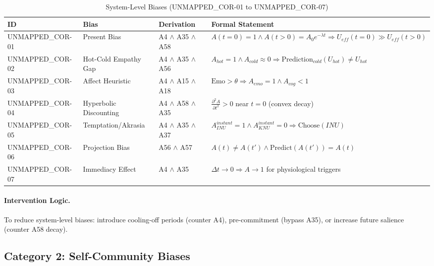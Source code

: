 \begin{table}[htbp]
\small
\centering
\caption{System-Level Biases (UNMAPPED_COR-01 to UNMAPPED_COR-07)}
\label{tab:cor-system}
\begin{tabular}{p{1.2cm}p{2.5cm}p{4cm}p{5cm}}
\toprule
\textbf{ID} & \textbf{Bias} & \textbf{Derivation} & \textbf{Formal Statement} \\
\midrule
UNMAPPED_COR-01 & Present Bias & A4 $\land$ A35 $\land$ A58 & $A(t=0) = 1 \land A(t>0) = A_0 e^{-\lambda t} \Rightarrow U_{eff}(t=0) \gg U_{eff}(t>0)$ \\
UNMAPPED_COR-02 & Hot-Cold Empathy Gap & A4 $\land$ A35 $\land$ A56 & $A_{hot} = 1 \land A_{cold} \approx 0 \Rightarrow \text{Prediction}_{cold}(U_{hot}) \neq U_{hot}$ \\
UNMAPPED_COR-03 & Affect Heuristic & A4 $\land$ A15 $\land$ A18 & $\text{Emo} > \theta \Rightarrow A_{emo} = 1 \land A_{cog} < 1$ \\
UNMAPPED_COR-04 & Hyperbolic Discounting & A4 $\land$ A58 $\land$ A35 & $\frac{\partial^2 A}{\partial t^2} > 0$ near $t=0$ (convex decay) \\
UNMAPPED_COR-05 & Temptation/Akrasia & A4 $\land$ A35 $\land$ A37 & $A_{INU}^{instant} = 1 \land A_{KNU}^{instant} = 0 \Rightarrow \text{Choose}(INU)$ \\
UNMAPPED_COR-06 & Projection Bias & A56 $\land$ A57 & $A(t) \neq A(t') \land \text{Predict}(A(t')) = A(t)$ \\
UNMAPPED_COR-07 & Immediacy Effect & A4 $\land$ A35 & $\Delta t \to 0 \Rightarrow A \to 1$ for physiological triggers \\
\bottomrule
\end{tabular}
\end{table}

\paragraph{Intervention Logic.} To reduce system-level biases: introduce cooling-off periods (counter A4), pre-commitment (bypass A35), or increase future salience (counter A58 decay).


\subsection{Category 2: Self-Community Biases}

